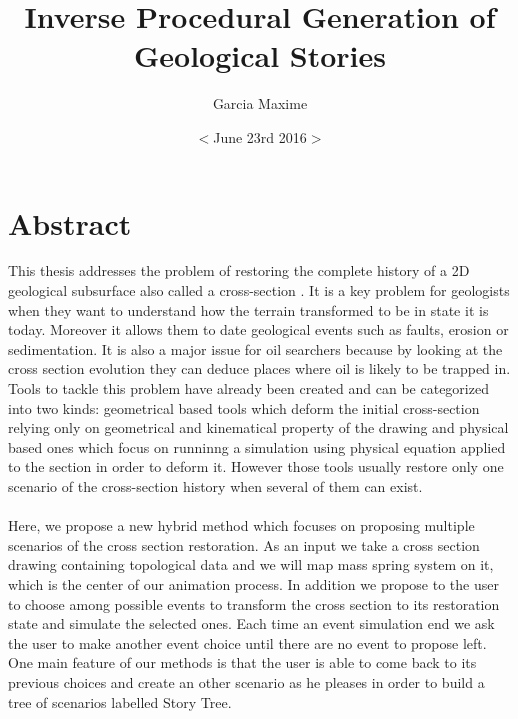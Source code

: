 \documentclass[12pt, a4paper]{memoir} %
\title{ Inverse Procedural Generation of Geological Stories}
\author{Garcia Maxime}
\date{ $<$June 23rd 2016$>$} %
\begin{document}
\frontmatter
\begin{titlingpage}
\maketitle
\end{titlingpage}


\tableofcontents

\chapter{Abstract}

This thesis addresses the problem of restoring the complete history of a 2D geological 
subsurface also called a cross-section \cite{BalancedCrossSections}. It is a key problem for geologists when they want to understand how the terrain transformed to be in state it is today. Moreover it allows them to date geological events such as faults, erosion or sedimentation. It is also a major issue for oil searchers because by looking at the cross section evolution they can deduce places where oil is likely to be trapped in. Tools to tackle this problem have already been created and can  be categorized into two kinds: geometrical based tools which deform the initial cross-section relying only on geometrical and kinematical property of the drawing and physical based ones which focus on runninng a simulation using physical equation applied to the section in order to deform it. However those tools usually restore only one scenario of the cross-section history when several of them can exist.\\\\
 Here, we propose a new hybrid method which focuses on proposing multiple scenarios of the cross section restoration. As an input we take a cross section drawing containing topological data and we will map mass spring system on it, which is the center of our animation process. In addition we propose to the user to choose among possible events to transform the cross section to its restoration state and simulate the selected ones. Each time an event simulation end we ask the user to make another event choice until there are no event to propose left. One main feature of our methods is that the user is able to come back to its previous choices and create an other scenario as he pleases in order to build a tree of scenarios labelled Story Tree.\\\\
\end{document}
